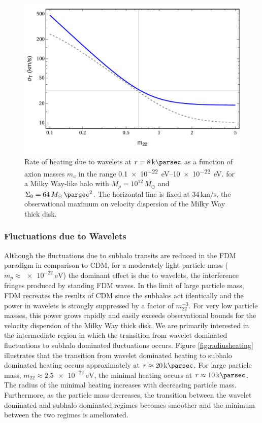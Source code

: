 \documentclass[usenatbib]{mnras}
\begin{document}
\begin{figure}
\includegraphics[width=\columnwidth]{FDM_mass_dep}
\vspace*{-5mm}
\caption{Rate of heating due to wavelets at $r = 8\, \si{\kilo \parsec}$ as a function of axion masses $m_{a}$ in the range \SIrange{0.1 e-22}{ 10 e-22}{\electronvolt}. for a Milky Way-like halo with $M_p = 10^{12} \, M_\odot$ and $\Sigma_0 = 64 \, M_\odot \, \si{\per\parsec^2}$. The horizontal line is fixed at $34\, \si{\kilo\meter\per\second}$, the observational maximum on velocity dispersion of the Milky Way thick disk. }
\label{fig:mass_dep_heating}
\end{figure}


\subsubsection{Fluctuations due to Wavelets}

Although the fluctuations due to subhalo transits are reduced in the FDM paradigm in comparison to CDM, for a moderately light particle mass ($m_p \approx \SI{e-22}{\electronvolt}$) the dominant effect is due to wavelets, the interference fringes produced by standing FDM waves. In the limit of large particle mass, FDM recreates the results of CDM since the subhalos act identically and the power in wavelets is strongly suppressed by a factor of $m_{22}^{-3}$. For very low particle masses, this power grows rapidly and easily exceeds observational bounds for the velocity dispersion of the Milky Way thick disk. We are primarily interested in the intermediate region in which the transition from wavelet dominated fluctuations to subhalo dominated fluctuations occurs. Figure \ref{fig:radiusheating} illustrates that the transition from wavelet dominated heating to subhalo dominated heating occurs approximately at $r \approx \SI{20}{\kilo \parsec}$. For large particle mass, $m_{22} \approx \SI{2.5e-22}{\electronvolt}$, the minimal heating occurs at $r \approx \SI{10}{\kilo \parsec}$. The radius of the minimal heating increases with decreasing particle mass. Furthermore, as the particle mass decreases, the transition between the wavelet dominated and subhalo dominated regimes becomes smoother and the minimum between the two regimes is ameliorated.   
\end{document}
